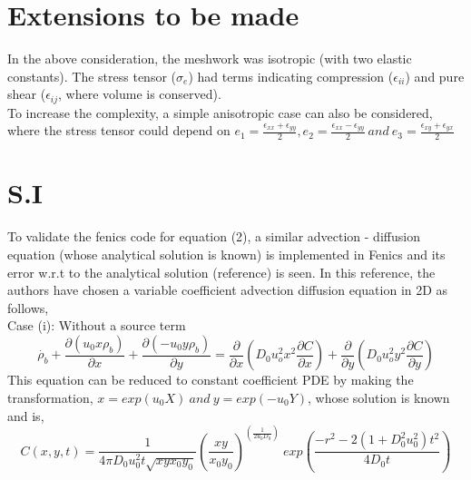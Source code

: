 \documentclass[12pt]{article}
\begin{document}
\section{Extensions to be made}
In the above consideration,  the meshwork was isotropic (with two elastic constants). The stress tensor ($\sigma_e $) had terms indicating compression ($\epsilon_{ii}$) and pure shear ($\epsilon_{ij}$, where volume is conserved). 
\\ To increase the complexity, a simple anisotropic case can also be considered, where the stress tensor could depend on $e_1 = \frac{\epsilon_{xx} + \epsilon_{yy}}{2} , e_2 =  \frac{\epsilon_{xx} - \epsilon_{yy}}{2} \ and \ e_3 =  \frac{\epsilon_{xy} + \epsilon_{yx}}{2}  $
\section{S.I}
To validate the fenics code for equation (2),  a similar advection - diffusion equation (whose analytical solution is known) is implemented in Fenics and its error w.r.t to the analytical solution (reference) is seen.
In this reference, the authors have chosen a variable coefficient advection diffusion equation in 2D as follows, 
\\
Case (i): Without a source term
\begin{equation}
\dot{\rho_b} + \frac{\partial(u_0x\rho_b)}{\partial x} + \frac{\partial(-u_0y\rho_b)}{\partial y} = \frac{\partial}{\partial x}(D_0u_o^2x^2 \frac{\partial C}{\partial x}) + \frac{\partial}{\partial y}(D_0u_o^2y^2 \frac{\partial C}{\partial y})
\end{equation} 
This equation can be reduced to constant coefficient PDE by making the transformation, $x = exp(u_0 X) \ and \ y = exp(-u_0Y)$, whose solution is known and is, 
\begin{equation}
C(x,y,t) = \frac{1}{4\pi D_0 u_0^2t \sqrt{xyx_0 y_0}}(\frac{xy}{x_0y_0})^{(\! \frac{1}{2u_0D_0})} \ exp(\frac{-r^2 - 2(1+ D_0^2u_0^2)t^2}{4D_0t})
\end{equation}
\end{document}
